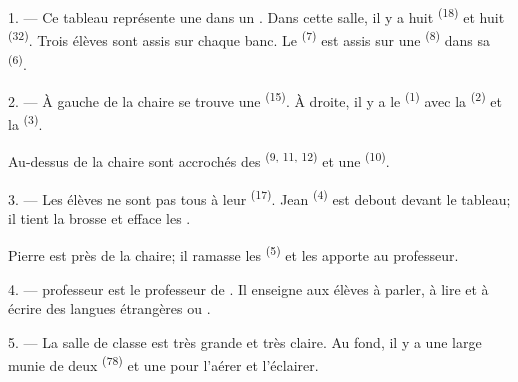 \VUsaut{2.0mm}
\VUsaut{3.2mm}
\VUsaut{2.6mm}
\VUsaut{3.4mm}
\VUornamento{9pt}
\VUsaut{5.0mm}
\VUsaut{3.0mm}
\VUfilet{16mm}
\VUsaut{5.6mm}

\VUsaut{1.4mm}
\VUsaut{2.2mm}
\VUfilet{20mm}
\VUsaut{6.4mm}

\VUsaut{3.0mm}

1. --- Ce tableau représente une  dans un
. Dans cette salle, il y a huit 
\textsuperscript{(18)} et huit  \textsuperscript{(32)}. Trois
élèves sont assis sur chaque banc. Le 
\textsuperscript{(7)} est assis sur une 
\textsuperscript{(8)} dans sa  \textsuperscript{(6)}.

2. --- À gauche de la chaire se trouve une 
\textsuperscript{(15)}. À droite, il y a le 
\textsuperscript{(1)} avec la  \textsuperscript{(2)} et la
 \textsuperscript{(3)}.

Au-dessus de la chaire sont accrochés des 
\textsuperscript{(9, 11, 12)} et une  \textsuperscript{(10)}.

3. --- Les élèves ne sont pas tous à leur 
\textsuperscript{(17)}. Jean \textsuperscript{(4)} est debout devant le
tableau; il tient la brosse et efface les .

Pierre est près de la chaire; il ramasse les 
\textsuperscript{(5)} et les apporte au professeur.

4. ---  professeur est le professeur de . Il enseigne aux élèves à parler, à lire et à écrire des langues
étrangères  ou
.

5. --- La salle de classe est très grande et très claire. Au fond, il y a une
large  munie de deux 
\textsuperscript{(78)} et une  pour l'aérer et
l'éclairer.

